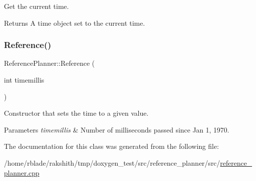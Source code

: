 Get the current time.

\begin{DoxyReturn}{Returns}
A time object set to the current time. 
\end{DoxyReturn}
\mbox{\label{classReferencePlanner_a5e2a5e0074a7f5c58ee00bedfdf5fcb8}} 
\subsubsection{\texorpdfstring{Reference()}{Reference()}}
{\footnotesize\ttfamily Reference\+Planner\+::\+Reference (\begin{DoxyParamCaption}\item[{int}]{timemillis }\end{DoxyParamCaption})\hspace{0.3cm}{\ttfamily [inline]}}

Constructor that sets the time to a given value.


\begin{DoxyParams}{Parameters}
{\em timemillis} & Number of milliseconds passed since Jan 1, 1970. \\
\hline
\end{DoxyParams}


The documentation for this class was generated from the following file\+:\begin{DoxyCompactItemize}
\item 
/home/rblade/rakshith/tmp/doxygen\+\_\+test/src/reference\+\_\+planner/src/\hyperlink{reference__planner_8cpp}{reference\+\_\+planner.\+cpp}\end{DoxyCompactItemize}
